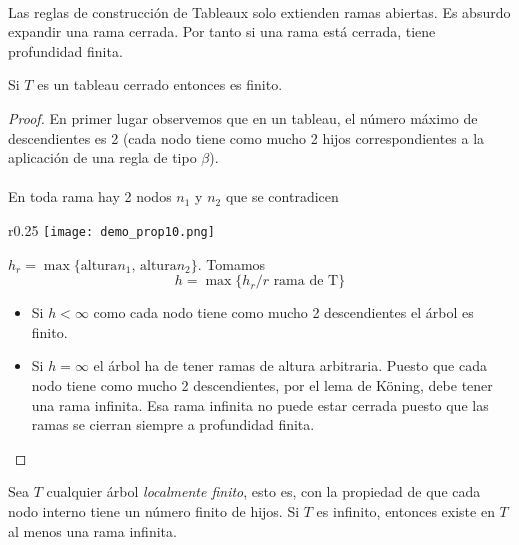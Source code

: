\paragraph{}
Las reglas de construcción de Tableaux solo extienden ramas abiertas. Es absurdo expandir una rama cerrada. Por tanto si una rama está cerrada, tiene profundidad finita. 
\begin{prop}Si $T$ es un tableau cerrado entonces es finito. 
\end{prop}
\begin{proof}

En primer lugar observemos que en un tableau, el número máximo de descendientes es 2 (cada nodo tiene como mucho 2 hijos correspondientes a la aplicación de una regla de tipo $\beta$). 
\paragraph{}
\begin{minipage}{16cm}
En toda rama hay 2 nodos $n_1$ y $n_2$ que se contradicen
\begin{wrapfigure}{r}{0.25\textwidth} 
    \centering
    \texttt{[image: demo\_prop10.png]}
\end{wrapfigure}
$h_r= \max \{ \mbox{altura}n_1, \, \mbox{altura}n_2 \}$. Tomamos 
\[ h=\max \{ h_r / r \mbox{ rama de T} \} \]
\begin{itemize}
	\item Si $h < \infty$ como cada nodo tiene como mucho 2 descendientes el árbol es finito. 
	\item Si $h= \infty$ el árbol ha de tener ramas de altura arbitraria. Puesto que cada nodo tiene como mucho 2 descendientes, por el lema de Köning, debe tener una rama infinita. Esa rama infinita no puede estar cerrada puesto que las ramas se cierran siempre a profundidad finita. 
\end{itemize}
\end{minipage}
\end{proof}
\begin{lemma}\cite{hortala_gonzalez_matematica_1998}
Sea $T$ cualquier árbol \textit{localmente finito}, esto es, con la propiedad de que cada nodo interno tiene un número finito de hijos. Si $T$ es infinito, entonces existe en $T$ al menos una rama infinita. 
\end{lemma}
